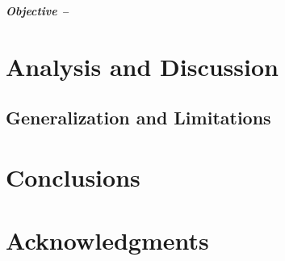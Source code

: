 \documentclass{sig-alternate-05-2015}
\begin{document}
\textit{\textbf{Objective -- }} 

\section{Analysis and Discussion}

\subsection{Generalization and Limitations}

\section{Conclusions}


\section{Acknowledgments}

%

%
%
\end{document}
